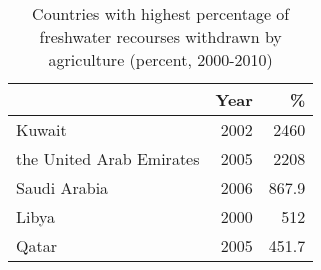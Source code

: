 \begin{table}
\centering
\caption{Countries with highest percentage of freshwater recourses withdrawn by agriculture (percent, 2000-2010)}
{\footnotesize
\begin{tabular}{lrr}
\toprule
  & Year & \%\\
\midrule
Kuwait & 2002 & 2460\\
the United Arab Emirates & 2005 & 2208\\
Saudi Arabia & 2006 & 867.9\\
Libya & 2000 & 512\\
Qatar & 2005 & 451.7\\
\toprule
\end{tabular}
}
\end{table}
